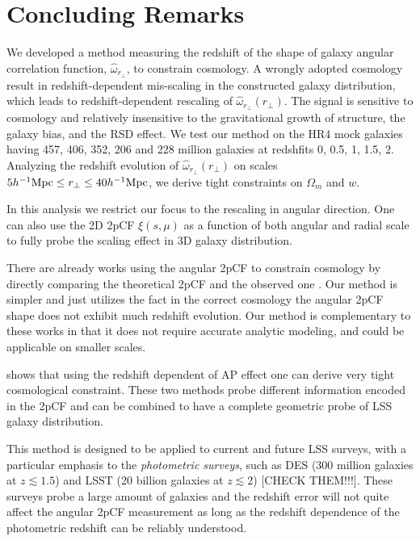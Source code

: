 \documentclass[iop]{emulateapj}
\begin{document}
\section{Concluding Remarks}
 
We developed a method measuring the redshift of the shape of galaxy angular correlation function, $\hat \omega_{r_\perp}$, to constrain cosmology.
A wrongly adopted cosmology result in redshift-dependent mis-scaling in the constructed galaxy distribution,
which leads to redshift-dependent rescaling of $\hat \omega_{r_\perp}(r_\perp)$.
The signal is sensitive to cosmology and relatively insensitive to the gravitational growth of structure,
the galaxy bias, and the RSD effect.
We test our method on the HR4 mock galaxies having 457, 406, 352, 206 and 228 million galaxies at redshfits 0, 0.5, 1, 1.5, 2.
Analyzing the redshift evolution of $\hat \omega_{r_\perp}(r_\perp)$ 
on scales $5  h^{-1} {\rm Mpc} \leq r_\perp \leq 40 h^{-1} {\rm Mpc}$, 
we derive tight constraints on $\Omega_m$ and $w$.

 
In this analysis we restrict our focus to the rescaling in angular direction.
One can also use the 2D 2pCF $\xi(s,\mu)$ 
as a function of both angular and radial scale to fully probe the scaling effect in 3D galaxy distribution.


There are already works using the angular 2pCF to constrain cosmology
by directly comparing the theoretical 2pCF and the observed one \citep{Salvador2014,Salvador2016}.
Our method is simpler and just utilizes the fact in the correct cosmology the angular 2pCF shape
does not exhibit much redshift evolution.
Our method is complementary to these works in that
it does not require accurate analytic modeling, 
and could be applicable on smaller scales.

 

\cite{Li2015,Li2016} shows that using the redshift dependent of AP effect 
one can derive very tight cosmological constraint.
These two methods probe different information encoded in the 2pCF 
and can be combined to have a complete geometric probe of LSS galaxy distribution.

This method is designed to be applied to current and future LSS surveys,
with a particular emphasis to the {\it photometric surveys},
such as DES (300 million galaxies at $z\lesssim1.5$) and LSST (20 billion galaxies at $z\lesssim2$) [CHECK THEM!!!].
These surveys probe a large amount of galaxies 
and the redshift error will not quite affect the angular 2pCF measurement 
as long as the redshift dependence of the photometric redshift can be reliably understood.
\end{document}
